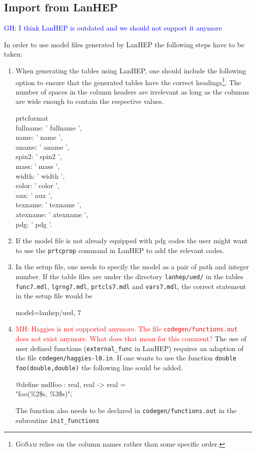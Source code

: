 \documentclass[11pt,a4paper]{refrep}
\newcommand{\gosamversion}{{3{.}0}}
\newcommand{\gosamv}[1][\gosamversion]{\textsc{GoSam}\xspace}
\begin{document}
\subsection{Import from LanHEP}
\textcolor{blue}{GH: I think LanHEP is outdated and we should not support it anymore}

In order to use model files generated by LanHEP the following steps
have to be taken:
\begin{enumerate}
\item When generating the tables using LanHEP, one should include the
   following option to ensure that the generated tables have the correct
   headings\footnote{\gosamv{} relies on the column names rather than
   some specific order.}. The number of spaces in the column headers are
   irrelevant as long as the columns are wide enough to contain the
   respective values.
\begin{example}
   prtcformat\\
      fullname: '  fullname  ',\\
      name:     '  name   ',\\
      aname:    '  aname  ',\\
      spin2:    '  spin2  ',\\
      mass:     '  mass  ',\\
      width:    '  width  ',\\
      color:    '  color  ',\\
      aux:      '  aux  ',\\
      texname:  '      texname      ',\\
      atexname: '     atexname      ',\\
      pdg:      '  pdg   '.
\end{example}
\item If the model file is not already equipped with pdg codes
   the user might want to use the \verb!prtcprop! command in
   LanHEP to add the relevant codes.
\item In the setup file, one needs to specify the model as a pair
   of path and integer number. If the table files are under the directory
   \texttt{lanhep/ued/} in the tables \texttt{func7.mdl}, \texttt{lgrng7.mdl},
   \texttt{prtcls7.mdl} and \texttt{vars7.mdl}, the correct statement in
   the setup file would be
\begin{example}
   model=lanhep/ued, 7
\end{example}
\item \textcolor{red}{MH: Haggies is not supported anymore. The file \texttt{codegen/functions.out} does not exist anymore. What does that mean for this comment?} The use of user defined functions (\texttt{external\_func} in LanHEP)
   requires an adaption of the file \texttt{codegen/haggies-l0.in}. If one
   wants to use the function \texttt{double foo(double,double)} the
   following line sould be added.
\begin{example}
@define mdlfoo : real, real -> real =\\ "foo(\%2\$s, \%3\$s)";
\end{example}
   The function also needs to be declared in \texttt{codegen/functions.out}
   in the subroutine \texttt{init\_functions}
\end{enumerate}
\end{document}
